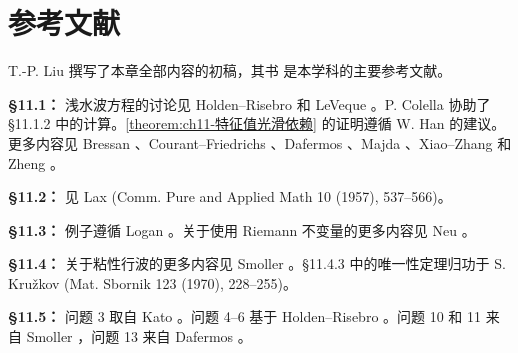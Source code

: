 \documentclass[../../main.tex]{subfiles}
\begin{document}
\section{参考文献}\label{section:ch11-参考文献}

T.-P. Liu 撰写了本章全部内容的初稿，其书 \cite{Lu} 是本学科的主要参考文献。

\textbf{\S11.1：} 浅水波方程的讨论见 Holden--Risebro \cite{H-R} 和 LeVeque \cite{LV}。P. Colella 协助了 \S11.1.2 中的计算。\cref{theorem:ch11-特征值光滑依赖} 的证明遵循 W. Han 的建议。更多内容见 Bressan \cite{Bs}、Courant--Friedrichs \cite{C-F}、Dafermos \cite{D}、Majda \cite{Mj}、Xiao--Zhang \cite{X-Z} 和 Zheng \cite{Zh}。

\textbf{\S11.2：} 见 Lax (Comm. Pure and Applied Math 10 (1957), 537--566)。

\textbf{\S11.3：} 例子遵循 Logan \cite{Lo}。关于使用 Riemann 不变量的更多内容见 Neu \cite{Ne1}。

\textbf{\S11.4：} 关于粘性行波的更多内容见 Smoller \cite{S}。\S11.4.3 中的唯一性定理归功于 S. Kru\v{z}kov (Mat. Sbornik 123 (1970), 228--255)。

\textbf{\S11.5：} 问题 3 取自 Kato \cite{K}。问题 4--6 基于 Holden--Risebro \cite{H-R}。问题 10 和 11 来自 Smoller \cite{S}，问题 13 来自 Dafermos \cite{D}。
\end{document}
